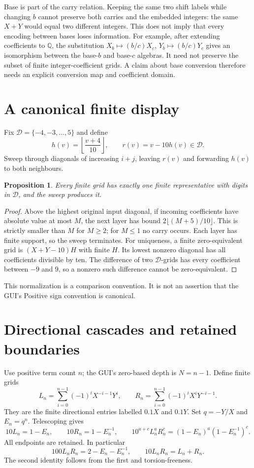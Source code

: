 \documentclass[11pt]{article}
\newtheorem{proposition}[theorem]{Proposition}
\newcommand{\Q}{\mathbb Q}
\newcommand{\D}{\mathcal D}
\begin{document}
Base is part of the carry relation. Keeping the same two shift labels
while changing $b$ cannot preserve both carries and the embedded integers:
the same $X+Y$ would equal two different integers. This does not imply
that every encoding between bases loses information. For example, after
extending coefficients to $\Q$, the substitution
$X_b\mapsto(b/c)X_c$, $Y_b\mapsto(b/c)Y_c$ gives an isomorphism between
the base-$b$ and base-$c$ algebras. It need not preserve the subset of finite
integer-coefficient grids. A claim about base conversion therefore needs
an explicit conversion map and coefficient domain.

\section{A canonical finite display}
Fix $\D=\{-4,-3,\ldots,5\}$ and define
\[
 h(v)=\left\lfloor\frac{v+4}{10}\right\rfloor,
 \qquad r(v)=v-10h(v)\in\D.
\]
Sweep through diagonals of increasing $i+j$, leaving $r(v)$ and forwarding
$h(v)$ to both neighbours.

\begin{proposition}
Every finite grid has exactly one finite representative with digits in
$\D$, and the sweep produces it.
\end{proposition}
\begin{proof}
Above the highest original input diagonal, if incoming coefficients have
absolute value at most $M$, the next layer has bound
$2\lfloor(M+5)/10\rfloor$. This is strictly smaller than $M$ for $M\ge2$;
for $M\le1$ no carry occurs. Each layer has finite support, so the sweep
terminates. For uniqueness, a finite zero-equivalent grid is
$(X+Y-10)H$ with finite $H$. Its lowest nonzero diagonal has all
coefficients divisible by ten. The difference of two $\D$-grids has every
coefficient between $-9$ and $9$, so a nonzero such difference cannot be
zero-equivalent.
\end{proof}

This normalization is a comparison convention. It is not an assertion
that the GUI's Positive sign convention is canonical.

\section{Directional cascades and retained boundaries}
Use positive term count $n$; the GUI's zero-based depth is $N=n-1$.
Define finite grids
\[
 L_n=\sum_{i=0}^{n-1}(-1)^iX^{-i-1}Y^i,
 \qquad R_n=\sum_{i=0}^{n-1}(-1)^iX^iY^{-i-1}.
\]
They are the finite directional entries labelled $0.1X$ and $0.1Y$.
Set $q=-Y/X$ and $E_n=q^n$. Telescoping gives
\begin{equation}\label{eq:boundary}
 10L_n=1-E_n,\qquad10R_n=1-E_n^{-1},\qquad
 10^{a+c}L_n^aR_n^c=(1-E_n)^a(1-E_n^{-1})^c.
\end{equation}
All endpoints are retained. In particular
\begin{equation}\label{eq:fuzzy}
 100L_nR_n=2-E_n-E_n^{-1},\qquad 10L_nR_n=L_n+R_n.
\end{equation}
The second identity follows from the first and torsion-freeness.
\end{document}
